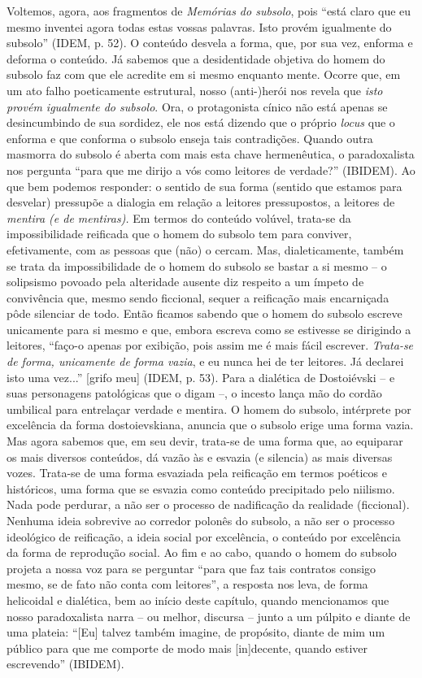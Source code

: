 Voltemos, agora, aos fragmentos de \emph{Memórias do subsolo}, pois
``está claro que eu mesmo inventei agora todas estas vossas palavras.
Isto provém igualmente do subsolo'' (IDEM, p. 52). O conteúdo desvela a
forma, que, por sua vez, enforma e deforma o conteúdo. Já sabemos que a
desidentidade objetiva do homem do subsolo faz com que ele acredite em
si mesmo enquanto mente. Ocorre que, em um ato falho poeticamente
estrutural, nosso (anti-)herói nos revela que \emph{isto provém
igualmente do subsolo}. Ora, o protagonista cínico não está apenas se
desincumbindo de sua sordidez, ele nos está dizendo que o próprio
\emph{locus} que o enforma e que conforma o subsolo enseja tais
contradições. Quando outra masmorra do subsolo é aberta com mais esta
chave hermenêutica, o paradoxalista nos pergunta ``para que me dirijo a
vós como leitores de verdade?'' (IBIDEM). Ao que bem podemos responder:
o sentido de sua forma (sentido que estamos para desvelar) pressupõe a
dialogia em relação a leitores pressupostos, a leitores de \emph{mentira
(e de mentiras).} Em termos do conteúdo volúvel, trata-se da
impossibilidade reificada que o homem do subsolo tem para conviver,
efetivamente, com as pessoas que (não) o cercam. Mas, dialeticamente,
também se trata da impossibilidade de o homem do subsolo se bastar a si
mesmo -- o solipsismo povoado pela alteridade ausente diz respeito a um
ímpeto de convivência que, mesmo sendo ficcional, sequer a reificação
mais encarniçada pôde silenciar de todo. Então ficamos sabendo que o
homem do subsolo escreve unicamente para si mesmo e que, embora escreva
como se estivesse se dirigindo a leitores, ``faço-o apenas por exibição,
pois assim me é mais fácil escrever. \emph{Trata-se de forma, unicamente
de forma vazia}, e eu nunca hei de ter leitores. Já declarei isto uma
vez...'' {[}grifo meu{]} (IDEM, p. 53). Para a dialética de Dostoiévski
-- e suas personagens patológicas que o digam --, o incesto lança mão do
cordão umbilical para entrelaçar verdade e mentira. O homem do subsolo,
intérprete por excelência da forma dostoievskiana, anuncia que o subsolo
erige uma forma vazia. Mas agora sabemos que, em seu devir, trata-se de
uma forma que, ao equiparar os mais diversos conteúdos, dá vazão às e
esvazia (e silencia) as mais diversas vozes. Trata-se de uma forma
esvaziada pela reificação em termos poéticos e históricos, uma forma que
se esvazia como conteúdo precipitado pelo niilismo. Nada pode perdurar,
a não ser o processo de nadificação da realidade (ficcional). Nenhuma
ideia sobrevive ao corredor polonês do subsolo, a não ser o processo
ideológico de reificação, a ideia social por excelência, o conteúdo por
excelência da forma de reprodução social. Ao fim e ao cabo, quando o
homem do subsolo projeta a nossa voz para se perguntar ``para que faz
tais contratos consigo mesmo, se de fato não conta com leitores'', a
resposta nos leva, de forma helicoidal e dialética, bem ao início deste
capítulo, quando mencionamos que nosso paradoxalista narra -- ou melhor,
discursa -- junto a um púlpito e diante de uma plateia: ``{[}Eu{]}
talvez também imagine, de propósito, diante de mim um público para que
me comporte de modo mais {[}in{]}decente, quando estiver escrevendo''
(IBIDEM).

